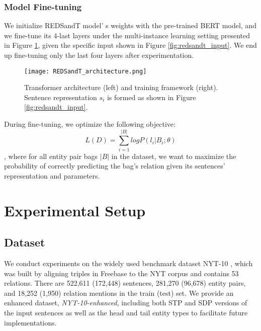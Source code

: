 \documentclass[11pt,a4paper]{article}
\begin{document}
\subsubsection{Model Fine-tuning}
We initialize REDSandT model' s weights with the pre-trained BERT model, and we fine-tune its 4-last layers under the multi-instance learning setting presented in Figure \ref{fig:redsandt_architecture}, given the specific input shown in Figure \ref{fig:redsandt_input}. We end up fine-tuning only the last four layers after experimentation.

 \begin{figure}[b]
    \centering
    \vspace{-4mm}
    \texttt{[image: REDSandT\_architecture.png]}
    \caption{Transformer architecture (left) and training framework (right). Sentence representation $s_i$ is formed as shown in Figure \ref{fig:redsandt_input}.}
    \label{fig:redsandt_architecture}
    \vspace{-5mm}
\end{figure}

During fine-tuning, we optimize the following objective:
\begin{equation}
    L(D) = \sum_{i=1}^{|B|}log P(l_i|B_i ; \theta)
\end{equation}
, where for all entity pair bags $|B|$ in the dataset, we want to maximize the probability of correctly predicting the bag's relation given its sentences' representation and parameters.

\section{Experimental Setup}
\label{sect:experiments}

\subsection{Dataset}
We conduct experiments on the widely used benchmark dataset NYT-10 \cite{Riedel2010}, which was built by aligning triples in Freebase to the NYT corpus and contains 53 relations. There are 522,611 (172,448) sentences, 281,270 (96,678) entity pairs, and 18,252 (1,950) relation mentions in the train (test) set. We provide an enhanced dataset, \textit{NYT-10-enhanced}, including both STP and SDP versions of the input sentences as well as the head and tail entity types to facilitate future implementations.
\end{document}
